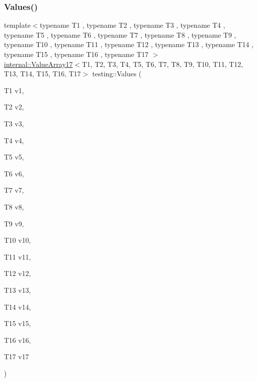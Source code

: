 \subsubsection{\texorpdfstring{Values()}{Values()}\hspace{0.1cm}{\footnotesize\ttfamily [18/51]}}
{\footnotesize\ttfamily template$<$typename T1 , typename T2 , typename T3 , typename T4 , typename T5 , typename T6 , typename T7 , typename T8 , typename T9 , typename T10 , typename T11 , typename T12 , typename T13 , typename T14 , typename T15 , typename T16 , typename T17 $>$ \\
\mbox{\hyperlink{classtesting_1_1internal_1_1_value_array17}{internal\+::\+Value\+Array17}}$<$T1, T2, T3, T4, T5, T6, T7, T8, T9, T10, T11, T12, T13, T14, T15, T16, T17$>$ testing\+::\+Values (\begin{DoxyParamCaption}\item[{T1}]{v1,  }\item[{T2}]{v2,  }\item[{T3}]{v3,  }\item[{T4}]{v4,  }\item[{T5}]{v5,  }\item[{T6}]{v6,  }\item[{T7}]{v7,  }\item[{T8}]{v8,  }\item[{T9}]{v9,  }\item[{T10}]{v10,  }\item[{T11}]{v11,  }\item[{T12}]{v12,  }\item[{T13}]{v13,  }\item[{T14}]{v14,  }\item[{T15}]{v15,  }\item[{T16}]{v16,  }\item[{T17}]{v17 }\end{DoxyParamCaption})}

\mbox{\label{namespacetesting_ab442a00c98b4bfb3bfa81f5e06bf53f9}} 
